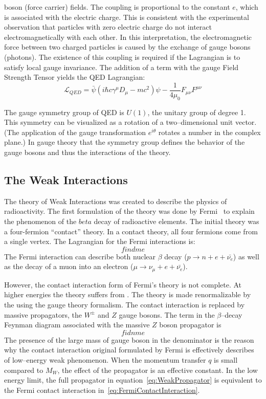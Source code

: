 boson (force carrier) fields.  The coupling is proportional to the constant
$e$, which is associated with the electric charge.  This is consistent with the
experimental observation that particles with zero electric charge do not
interact electromagnetically with each other.  In this interpretation, the
electromagnetic force between two charged particles is caused by the exchange
of gauge bosons (photons).  The existence of this coupling is required if the
Lagrangian is to satisfy local gauge invariance. The addition of a term with
the gauge Field Strength Tensor yields the QED Lagrangian:
\begin{equation}
  \mathcal{L}_{QED} = \bar \psi (i\hbar c\gamma^\mu D_\mu - mc^2) \psi -
  \frac{1}{4\mu_0}F_{\mu\nu}F^{\mu\nu}
\end{equation}

The gauge symmetry group of QED is $U(1)$, the unitary group of degree 1.  This
symmetry can be visualized as a rotation of a two--dimensional unit vector. (The
application of the gauge transformation $e^{i\theta}$ rotates a number in the
complex plane.)  In gauge theory that the symmetry group
defines the behavior of the gauge bosons and thus the interactions of the
theory.  

\subsection{The Weak Interactions}

The theory of Weak Interactions was created to describe the physics of
radioactivity.  The first formulation of the theory was done by
Fermi~\cite{ref:FermiWeakInteration} to explain the phenomenon of the $beta$
decay of radioactive elements.  The initial theory was a four-fermion
``contact'' theory.  In a contact theory, all four fermions come from a single
vertex.  The Lagrangian for the Fermi interactions is:
\begin{equation}
 find me 
 \label{eq:FermiContactInteraction}
\end{equation}
The Fermi interaction can describe both nuclear $\beta$ decay ($p \to n + e +
\bar{\nu_e}$) as well as the decay of a muon into an electron ($\mu \to \nu_\mu
+ e + \bar{\nu_e}$).

However, the contact interaction form of Fermi's theory is not complete.  At
higher energies the theory suffers from .  The theory is made
renormalizable by the using the gauge theory formalism.  The contact interaction
is replaced by massive propagators, the $W^\pm$ and $Z$ gauge bosons.  The term
in the $\beta$--decay Feynman diagram associated with the massive $Z$ boson
propagator is
\begin{equation}
  fidn me
  \label{eq:WeakPropagator}
\end{equation}
The presence of the large mass of gauge boson in the denominator is the reason
why the contact interaction original formulated by Fermi is effectively
describes of low--energy weak phenomenon.  When the momentum transfer $q$ is
small compared to $M_W$, the effect of the propagator is an effective constant.
In the low energy limit, the full propagator in equation~\ref{eq:WeakPropagator}
is equivalent to the Fermi contact interaction
in~\ref{eq:FermiContactInteraction}.

